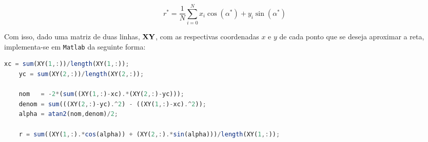 \begin{equation}\label{eq:r}
	r^* = \frac{1}{N}\sum_{i=0}^{N} x_i\cos(\alpha^*) + y_i\sin(\alpha^*)
\end{equation}

Com isso, dado uma matriz de duas linhas, $\mathbf{XY}$, com as respectivas coordenadas $x$ e $y$ de cada ponto que se deseja aproximar a reta, implementa-se em \texttt{Matlab} da seguinte forma:

\begin{lstlisting}[language=Octave]
	xc = sum(XY(1,:))/length(XY(1,:));
	yc = sum(XY(2,:))/length(XY(2,:));
	
	nom   = -2*(sum((XY(1,:)-xc).*(XY(2,:)-yc)));
	denom = sum(((XY(2,:)-yc).^2) - ((XY(1,:)-xc).^2));
	alpha = atan2(nom,denom)/2;
	
	r = sum((XY(1,:).*cos(alpha)) + (XY(2,:).*sin(alpha)))/length(XY(1,:));
\end{lstlisting}